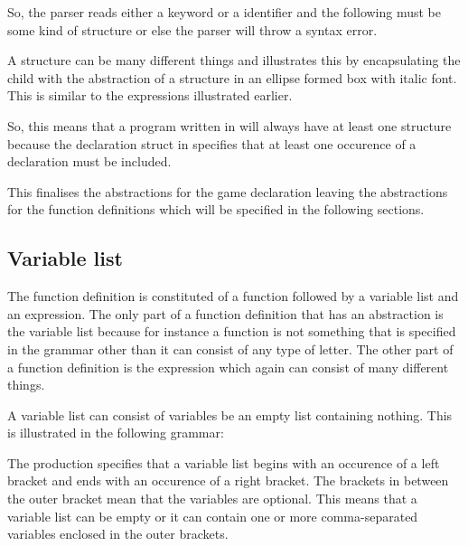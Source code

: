 \begin{ebnf}
\end{ebnf}

So, the parser reads either a keyword or a identifier and the following must be some kind of structure or else the parser will throw a syntax error.

A structure can be many different things and  illustrates this by encapsulating the child with the abstraction of a structure in an ellipse formed box with italic font. This is similar to the expressions illustrated earlier.



So, this means that a program written in \productname{} will always have at least one structure because the declaration struct in  specifies that at least one occurence of a declaration must be included.

This finalises the abstractions for the game declaration leaving the abstractions for the function definitions which will be specified in the following sections.

\subsection{Variable list}

The function definition is constituted of a function followed by a variable list and an expression. The only part of a function definition that has an abstraction is the variable list because for instance a function is not something that is specified in the grammar other than it can consist of any type of letter. The other part of a function definition is the expression which again can consist of many different things. 

A variable list can consist of variables be an empty list containing nothing. This is illustrated in the following grammar:

\begin{ebnf}
\end{ebnf}

The production specifies that a variable list begins with an occurence of a left bracket and ends with an occurence of a right bracket. The brackets in between the outer bracket mean that the variables are optional. This means that a variable list can be empty or it can contain one or more comma-separated variables enclosed in the outer brackets.

